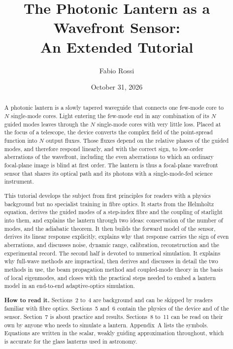 \documentclass[11pt,a4paper]{article}
\title{The Photonic Lantern as a Wavefront Sensor:\\ An Extended Tutorial}
\author{Fabio Rossi}
\date{October 31, 2026}
\begin{document}
\maketitle

\begin{abstract}
A photonic lantern is a slowly tapered waveguide that connects one few-mode core to $N$ single-mode cores. Light entering the few-mode end in any combination of its $N$ guided modes leaves through the $N$ single-mode cores with very little loss. Placed at the focus of a telescope, the device converts the complex field of the point-spread function into $N$ output fluxes. Those fluxes depend on the relative phases of the guided modes, and therefore respond linearly, and with the correct sign, to low-order aberrations of the wavefront, including the even aberrations to which an ordinary focal-plane image is blind at first order. The lantern is thus a focal-plane wavefront sensor that shares its optical path and its photons with a single-mode-fed science instrument.

This tutorial develops the subject from first principles for readers with a physics background but no specialist training in fibre optics. It starts from the Helmholtz equation, derives the guided modes of a step-index fibre and the coupling of starlight into them, and explains the lantern through two ideas: conservation of the number of modes, and the adiabatic theorem. It then builds the forward model of the sensor, derives its linear response explicitly, explains why that response carries the sign of even aberrations, and discusses noise, dynamic range, calibration, reconstruction and the experimental record. The second half is devoted to numerical simulation. It explains why full-wave methods are impractical, then derives and discusses in detail the two methods in use, the beam propagation method and coupled-mode theory in the basis of local eigenmodes, and closes with the practical steps needed to embed a lantern model in an end-to-end adaptive-optics simulation.

\textbf{How to read it.} Sections~2 to~4 are background and can be skipped by readers familiar with fibre optics. Sections~5 and~6 contain the physics of the device and of the sensor. Section~7 is about practice and results. Sections~8 to~11 can be read on their own by anyone who needs to simulate a lantern. Appendix~A lists the symbols. Equations are written in the scalar, weakly guiding approximation throughout, which is accurate for the glass lanterns used in astronomy.
\end{abstract}
\end{document}
